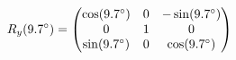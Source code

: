 \documentclass[preview]{standalone}
\begin{document}
\begin{align*}
\special{dvisvgm:raw <g id='unique000'>}R_y(9.7^\circ) = \begin{pmatrix} \cos(9.7^\circ) & 0 & -\sin(9.7^\circ) \\ 0 & 1 & 0 \\ \sin(9.7^\circ) & 0 & \cos(9.7^\circ) \end{pmatrix}\special{dvisvgm:raw </g>}
\end{align*}
\end{document}

